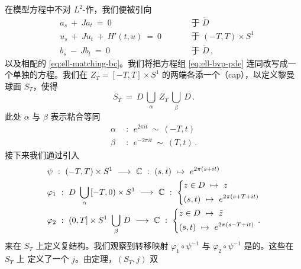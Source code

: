 在模型方程中不对 $L^{2}$-\trGradient{}作\trRegularization，我们便被引向
\begin{equation}\label{eq:ell-bvp-pde}
\begin{aligned}
&a_{s}\ +\ Ja_{t}\ =\ 0\qquad&&\text{于 }\mathring{D}\\
&u_{s}\ +\ Ju_{t}\ +\ H'(t,u)\ =\ 0\qquad&&\text{于 }(-T,T)\times S^{1}\\
&b_{s}\ -\ Jb_{t}\ =\ 0\qquad&&\text{于 }\mathring{D}\,,
\end{aligned}
\end{equation}
以及相配的\trBoundaryCondition{} \eqref{eq:ell-matching-bc}。我们将把方程组%
\eqref{eq:ell-bvp-pde} 连同\trBoundaryCondition{}改写成一个单独的方程。我们在%
\trCylinder{} $Z_{T}=[-T,T]\times S^{1}$ 的两端各添一个\textbf{\trCapDisk}（cap），以定义黎曼球面%
$S_{T}$，使得
\begin{equation}\label{eq:ell-sphere-st}
S_{T}\ =\ D\ \bigcup_{\alpha}\ Z_{T}\ \bigcup_{\beta}\ D\,.
\end{equation}
此处 $\alpha$ 与 $\beta$ 表示粘合等同
\[
\begin{aligned}
\alpha\ \ &:\ \ e^{2\pi it}\ \sim\ (-T,t)\\
\beta\ \ &:\ \ e^{-2\pi it}\ \sim\ (T,t)\,.
\end{aligned}
\]
接下来我们通过引入\trChart
\begin{equation}\label{eq:ell-charts-st}
\begin{aligned}
&\psi\ :\ (-T,T)\times S^{1}\ \longrightarrow\ \C\ :\ (s,t)\ \mapsto\ e^{2\pi(s+it)}\\
&\varphi_{1}\ :\ D\ \bigcup_{\alpha}\,[-T,0)\times S^{1}\ \longrightarrow\ \C\ :\ %
\left\{\begin{aligned}
&z\in D\ \mapsto\ z\\
&(s,t)\ \mapsto\ e^{2\pi(s+T+it)}
\end{aligned}\right.\\
&\varphi_{2}\ :\ (0,T]\times S^{1}\ \bigcup_{\beta}\,D\ \longrightarrow\ \C\ :\ %
\left\{\begin{aligned}
&z\in D\ \mapsto\ \bar{z}\\
&(s,t)\ \mapsto\ e^{2\pi(s-T+it)}
\end{aligned}\right.\,.
\end{aligned}
\end{equation}
来在 $S_{T}$ 上定义复\trManifold{}结构。我们观察到转移映射 $\varphi_{1}\circ\psi^{-1}$%
与 $\varphi_{2}\circ\psi^{-1}$ 是\trHolomorphic{}的。这些\trChart{}在 $S_{T}$ 上%
定义了一个\trComplexStructure{} $j$。由\trUniformization{}定理，$(S_{T},j)$ 双%
